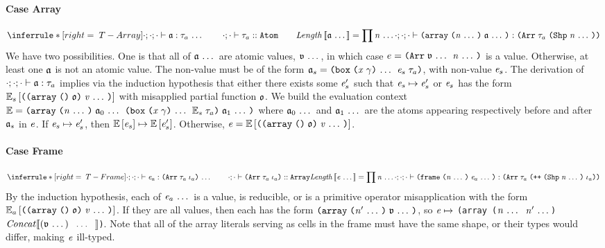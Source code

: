 \begin{sproof}
  \paragraph{Case {\sc Array}}
  \[{\infr[T-Array]
    {\sequence{\typeof{\emptyEnv}{\emptyEnv}{\emptyEnv}{\atom}{\type_a}}
      \qquad
      \kindof{\emptyEnv}{\emptyEnv}{\type_a}{\kindatom}
      \qquad
      \mathit{Length}\llb \sequence{\atom} \rrb = \prod{\sequence{\nat}}}
    {\typeof{\emptyEnv}{\emptyEnv}{\emptyEnv}
      {\arrlit{\sequence{\atom}}{\sequence{\nat}}}
      {\typearray{\type_a}{\idxshape{\sequence{\nat}}}}}}\]
  We have two possibilities.
  One is that all of $\mathfrak{a} \, \ldots \,$ are atomic values, $\mathfrak{v} \, \ldots \,$,
  in which case $e = \typearray{\sequence{\atval}}{\sequence{\nat}}$ is a value.
  Otherwise, at least one $\mathfrak{a}$ is not an atomic value.
  The non-value must be of the form
  $\atom_s = \dsum{\sequence{\notevar{\var}{\sort}}}{\expr_s}{\type_a}$,
  with non-value $\mathit{e}_s$.
  The derivation of $\cdot;\cdot;\cdot \vdash \mathfrak{a} : \mathit{\tau}_a$
  implies via the induction hypothesis that
  either there exists some $\mathit{e}_s'$ such that $\mathit{e}_s \mapsto \mathit{e}_s'$
  or $\mathit{e}_s$ has the form $\ctxt_s\left[\misapp\right]$
  with misapplied partial function $\mathfrak{o}$.
  We build the evaluation context
  $\ctxt = \arrlit{\sequence{\atom_0} \;
    \dsum{\sequence{\notevar{\var}{\sort}}}{\ctxt_s}{\type_a}
    \; \sequence{\atom_1}}
  {\sequence{\nat}}$
  where $\mathfrak{a}_0 \, \ldots \,$ and $\mathfrak{a}_1 \, \ldots \,$
  are the atoms appearing respectively before and after $\mathfrak{a}_s$ in $\mathit{e}$.
  If $\mathit{e}_s \mapsto \mathit{e}_s'$, then $\mathbb{E}\left[\mathit{e}_s\right] \mapsto \mathbb{E}\left[\mathit{e}_s'\right]$.
  Otherwise, $\expr = \ctxt\left[\misapp\right]$.

  \paragraph{Case {\sc Frame}}
  \[{\infr[T-Frame]
    {\sequence{\typeof{\emptyEnv}{\emptyEnv}{\emptyEnv}
        {\expr_a}
        {\typearray{\type_a}{\idx_a}}}
      \qquad
    \kindof{\emptyEnv}{\emptyEnv}{\typearray{\type_a}{\idx_a}}{\kindarray}
    \\\\
    \mathit{Length}\llb \sequence{\expr} \rrb = \prod{\sequence{\nat}}}
    {\typeof{\emptyEnv}{\emptyEnv}{\emptyEnv}
      {\frm{\sequence{\expr_a}}{\sequence{\nat}}}
      {\typearray{\type_a}{\idxappend{\idxshape{\sequence{\nat}} \; \idx_a}}}}}\]
  By the induction hypothesis,
  each of $\mathit{e}_a \, \ldots \,$ is a value, is reducible,
  or is a primitive operator misapplication
  with the form $\ctxt_a\left[\misapp\right]$.
  If they are all values, then
  each has the form $\arrlit{\sequence{\atval}}{\sequence{\nat'}}$, so
  $\mathit{e} \mapsto$
  {\tt (array ($\mathit{n} \, \ldots \,$ $\mathit{n}' \, \ldots \,$)
    $\mathit{Concat}\llbracket(\mathfrak{v} \, \ldots \,)$ $\, \ldots \,$
    $\rrbracket$)}.
  Note that all of the array literals serving as cells in the frame must have the same shape,
  or their types would differ, making $\mathit{e}$ ill-typed.


\end{sproof}
